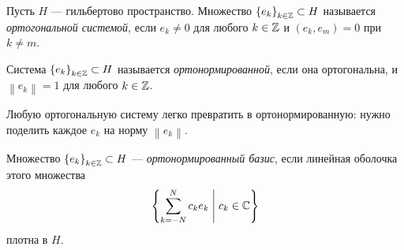 \documentclass[../complex-analysis.tex]{subfiles}
\begin{document}
\begin{df}
 Пусть $ H $ --- гильбертово пространство. Множество $ \left\{e_k\right\}_{k \in \mathbb{Z}} \subset H  $ называется \textit{ортогональной системой}, если $ e_k \neq 0 $ для любого $ k \in \mathbb{Z} $ и $ (e_k, e_m) = 0 $ при $ k \neq m $.
\end{df}
\begin{df}
 Система $ \left\{e_k\right\}_{k \in \mathbb{Z}} \subset H  $ называется \textit{ортонормированной}, если она ортогональна, и $\left\| e_k \right\|=1$ для любого $ k \in \mathbb{Z} $.
\end{df}
Любую ортогональную систему легко превратить в ортонормированную: нужно поделить каждое $ e_k $ на норму $ \left\| e_k \right\| $.
\begin{df}
 Множество $ \left\{e_k\right\}_{k\in\mathbb{Z}}  \subset H $ --- \textit{ортонормированный базис}, если линейная оболочка этого множества
 \begin{align*}
  \left\{ \sum_{k=-N}^{N} c_k e_k \;\middle|\; c_k \in \mathbb{C} \right\}
 \end{align*} плотна в $ H $.
\end{df}
\end{document}
